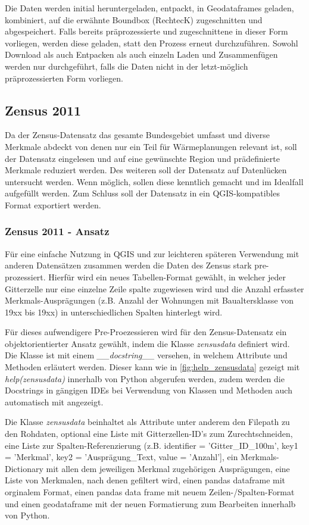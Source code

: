 			Die Daten werden initial heruntergeladen, entpackt, in Geodataframes geladen, kombiniert, auf die erwähnte Boundbox (RechtecK) zugeschnitten und abgespeichert. Falls bereits präprozessierte und zugeschnittene in dieser Form vorliegen, werden diese geladen, statt den Prozess erneut durchzuführen. Sowohl Download als auch Entpacken als auch einzeln Laden und Zusammenfügen werden nur durchgeführt, falls die Daten nicht in der letzt-möglich präprozessierten Form vorliegen.
			
			
		\subsection{Zensus 2011}
			Da der Zensus-Datensatz das gesamte Bundesgebiet umfasst und diverse Merkmale abdeckt von denen nur ein Teil für Wärmeplanungen relevant ist, soll der Datensatz eingelesen und auf eine gewünschte Region und prädefinierte Merkmale reduziert werden. Des weiteren soll der Datensatz auf Datenlücken untersucht werden. Wenn möglich, sollen diese kenntlich gemacht und im Idealfall aufgefüllt werden. Zum Schluss soll der Datensatz in ein QGIS-kompatibles Format exportiert werden. 
			
			\subsubsection{Zensus 2011 - Ansatz}
				Für eine einfache Nutzung in QGIS und zur leichteren späteren Verwendung mit anderen Datensätzen zusammen werden die Daten des Zensus stark pre-prozessiert. Hierfür wird ein neues Tabellen-Format gewählt, in welcher jeder Gitterzelle nur eine einzelne Zeile spalte zugewiesen wird und die Anzahl erfasster Merkmals-Ausprägungen (z.B. Anzahl der Wohnungen mit Baualtersklasse von 19xx bis 19xx) in unterschiedlichen Spalten hinterlegt wird.
			
				Für dieses aufwendigere Pre-Proezessieren wird für den Zensus-Datensatz ein objektorientierter Ansatz gewählt, indem die Klasse \textit{zensusdata} definiert wird. Die Klasse ist mit einem \textit{\_\_docstring\_\_} versehen, in welchem Attribute und Methoden erläutert werden. Dieser kann wie in \autoref{fig:help_zensusdata} gezeigt mit \textit{help(zensusdata)} innerhalb von Python abgerufen werden, zudem werden die Docstrings in gängigen IDEs bei Verwendung von Klassen und Methoden auch automatisch mit angezeigt. 
				
				Die Klasse \textit{zensusdata} beinhaltet als Attribute unter anderem den Filepath zu den Rohdaten, optional eine Liste mit Gitterzellen-ID's zum Zurechtschneiden, eine Liste zur Spalten-Referenzierung (z.B. identifier = 'Gitter\_ID\_100m', key1 = 'Merkmal', key2 = 'Ausprägung\_Text, value = 'Anzahl'], ein Merkmals-Dictionary mit allen dem jeweiligen Merkmal zugehörigen Ausprägungen, eine Liste von Merkmalen, nach denen gefiltert wird, einen pandas dataframe mit orginalem Format, einen pandas data frame mit neuem Zeilen-/Spalten-Format und einen geodataframe mit der neuen Formatierung zum Bearbeiten innerhalb von Python.
			
